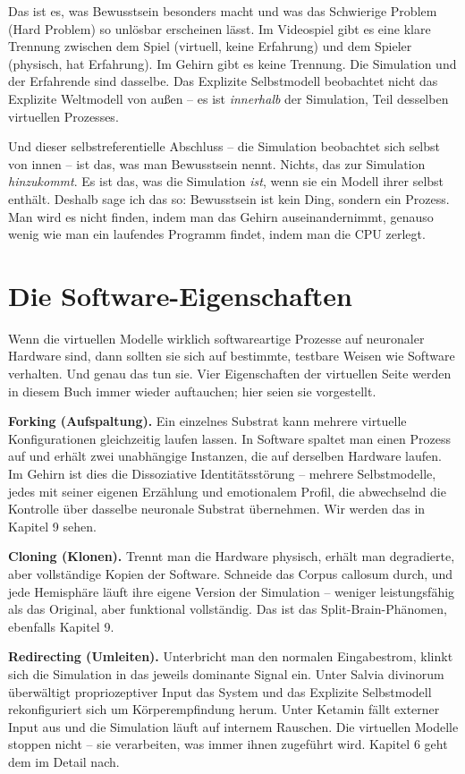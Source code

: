 \documentclass[11pt, twoside, openright]{book}
\begin{document}
Das ist es, was Bewusstsein besonders macht und was das Schwierige Problem (Hard Problem) so unlösbar erscheinen lässt. Im Videospiel gibt es eine klare Trennung zwischen dem Spiel (virtuell, keine Erfahrung) und dem Spieler (physisch, hat Erfahrung). Im Gehirn gibt es keine Trennung. Die Simulation und der Erfahrende sind dasselbe. Das Explizite Selbstmodell beobachtet nicht das Explizite Weltmodell von außen -- es ist \textit{innerhalb} der Simulation, Teil desselben virtuellen Prozesses.

Und dieser selbstreferentielle Abschluss -- die Simulation beobachtet sich selbst von innen -- ist das, was man Bewusstsein nennt. Nichts, das zur Simulation \textit{hinzukommt}. Es ist das, was die Simulation \textit{ist}, wenn sie ein Modell ihrer selbst enthält. Deshalb sage ich das so: Bewusstsein ist kein Ding, sondern ein Prozess. Man wird es nicht finden, indem man das Gehirn auseinandernimmt, genauso wenig wie man ein laufendes Programm findet, indem man die CPU zerlegt.

\section*{Die Software-Eigenschaften}

Wenn die virtuellen Modelle wirklich softwareartige Prozesse auf neuronaler Hardware sind, dann sollten sie sich auf bestimmte, testbare Weisen wie Software verhalten. Und genau das tun sie. Vier Eigenschaften der virtuellen Seite werden in diesem Buch immer wieder auftauchen; hier seien sie vorgestellt.

\textbf{Forking (Aufspaltung).} Ein einzelnes Substrat kann mehrere virtuelle Konfigurationen gleichzeitig laufen lassen. In Software spaltet man einen Prozess auf und erhält zwei unabhängige Instanzen, die auf derselben Hardware laufen. Im Gehirn ist dies die Dissoziative Identitätsstörung -- mehrere Selbstmodelle, jedes mit seiner eigenen Erzählung und emotionalem Profil, die abwechselnd die Kontrolle über dasselbe neuronale Substrat übernehmen. Wir werden das in Kapitel 9 sehen.

\textbf{Cloning (Klonen).} Trennt man die Hardware physisch, erhält man degradierte, aber vollständige Kopien der Software. Schneide das Corpus callosum durch, und jede Hemisphäre läuft ihre eigene Version der Simulation -- weniger leistungsfähig als das Original, aber funktional vollständig. Das ist das Split-Brain-Phänomen, ebenfalls Kapitel 9.

\textbf{Redirecting (Umleiten).} Unterbricht man den normalen Eingabestrom, klinkt sich die Simulation in das jeweils dominante Signal ein. Unter Salvia divinorum überwältigt propriozeptiver Input das System und das Explizite Selbstmodell rekonfiguriert sich um Körperempfindung herum. Unter Ketamin fällt externer Input aus und die Simulation läuft auf internem Rauschen. Die virtuellen Modelle stoppen nicht -- sie verarbeiten, was immer ihnen zugeführt wird. Kapitel 6 geht dem im Detail nach.
\end{document}
